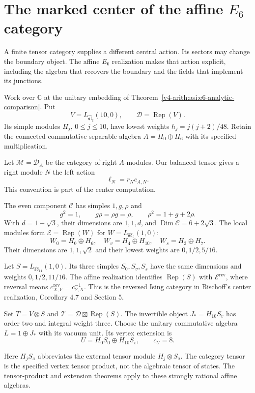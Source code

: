 \section{The marked center of the affine \texorpdfstring{$E_6$}{E6} category}
\label{v4-arith:centers:sec:e6}

A finite tensor category supplies a different central action.
Its sectors may change the boundary object. The affine
$E_6$ realization makes that action explicit, including
the algebra that recovers the boundary and the fields
that implement its junctions.

Work over $\mathbb C$ at the unitary embedding of
Theorem~\ref{v4-arith:asi:e6-analytic-comparison}.
Put
\[
 V=L_{\widehat{\mathfrak{sl}}_2}(10,0),\qquad
 \mathcal D=\operatorname{Rep}(V).
\]
Its simple modules $H_j$, $0\leq j\leq10$, have lowest weights
$h_j=j(j+2)/48$. Retain the connected commutative separable
algebra $A=H_0\oplus H_6$ with its specified multiplication.

Let $\mathcal M=\mathcal D_A$ be the category of right
$A$-modules. Our balanced tensor gives a right module $N$
the left action
\[
 \ell_N=r_Nc_{A,N}.
\]
This convention is part of the center computation.

The even component $\mathcal C$ has simples $1,g,\rho$ and
\[
 g^2=1,\qquad g\rho=\rho g=\rho,\qquad
 \rho^2=1+g+2\rho.
\]
With $d=1+\sqrt3$, their dimensions are $1,1,d$, and
$\operatorname{Dim}\mathcal C=6+2\sqrt3$.
The local modules form
$\mathcal E=\operatorname{Rep}(W)$ for
$W=L_{\widehat{\mathfrak{so}}_5}(1,0)$:
\[
 W_0=H_0\oplus H_6,\quad
 W_v=H_4\oplus H_{10},\quad
 W_s=H_3\oplus H_7.
\]
Their dimensions are $1,1,\sqrt2$ and their lowest weights
are $0,1/2,5/16$.

Let $S=L_{\widehat{\mathfrak{so}}_{11}}(1,0)$.
Its three simples $S_0,S_v,S_s$ have the same dimensions and
weights $0,1/2,11/16$. The affine realization identifies
$\operatorname{Rep}(S)$ with $\mathcal E^{\mathrm{rev}}$,
where reversal means
$c^{\mathrm{rev}}_{X,Y}=c_{Y,X}^{-1}$.
This is the reversed Ising category in Bischoff's
center realization, Corollary 4.7 and Section 5.

Set $T=V\otimes S$ and
$\mathcal T=\mathcal D\boxtimes\operatorname{Rep}(S)$.
The invertible object $J_*=H_{10}S_v$ has order two and
integral weight three. Choose the unitary commutative algebra
$L=1\oplus J_*$ with its vacuum unit.
Its vertex extension is
\[
 U=H_0S_0\oplus H_{10}S_v,\qquad c_U=8.
\]

Here $H_jS_a$ abbreviates the external tensor module
$H_j\otimes S_a$. The category tensor is the specified
vertex tensor product, not the algebraic tensor of states.
The tensor-product and extension theorems apply to these
strongly rational affine algebras.

